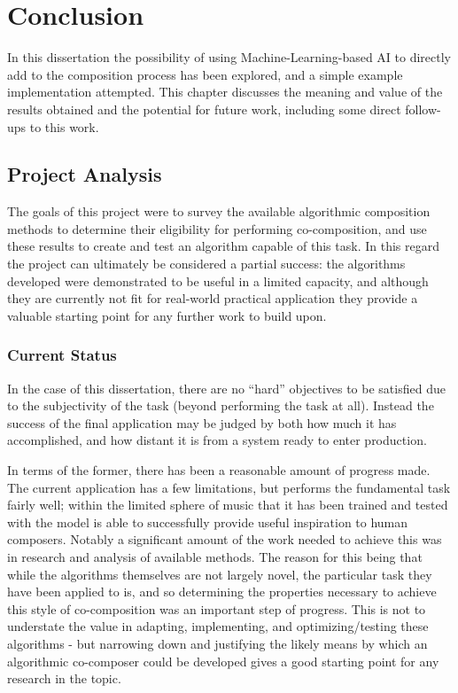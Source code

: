 \documentclass[ author={Stephen Livermore-Tozer},
				supervisor={Dr. Peter Flach},
				degree={MEng},
				title={Algorithmic Co-composition Using Machine Learning},
				subtitle={},
				type={research},
				year={2016} ]{dissertation}
\begin{document}
	
	\chapter{Conclusion}
	\label{chap:conclusion}
	
	In this dissertation the possibility of using Machine-Learning-based AI to directly add to the composition process has been explored, and a simple example implementation attempted. This chapter discusses the meaning and value of the results obtained and the potential for future work, including some direct follow-ups to this work.
	
	\section{Project Analysis}
	\label{sec:project-analysis}
	
	The goals of this project were to survey the available algorithmic composition methods to determine their eligibility for performing co-composition, and use these results to create and test an algorithm capable of this task. In this regard the project can ultimately be considered a partial success: the algorithms developed were demonstrated to be useful in a limited capacity, and although they are currently not fit for real-world practical application they provide a valuable starting point for any further work to build upon.
	
	\subsection{Current Status}
	\label{sec:project-status}
	
	In the case of this dissertation, there are no ``hard'' objectives to be satisfied due to the subjectivity of the task (beyond performing the task at all). Instead the success of the final application may be judged by both how much it has accomplished, and how distant it is from a system ready to enter production.
	
	In terms of the former, there has been a reasonable amount of progress made. The current application has a few limitations, but performs the fundamental task fairly well; within the limited sphere of music that it has been trained and tested with the model is able to successfully provide useful inspiration to human composers. Notably a significant amount of the work needed to achieve this was in research and analysis of available methods. The reason for this being that while the algorithms themselves are not largely novel, the particular task they have been applied to is, and so determining the properties necessary to achieve this style of co-composition was an important step of progress. This is not to understate the value in adapting, implementing, and optimizing/testing these algorithms - but narrowing down and justifying the likely means by which an algorithmic co-composer could be developed gives a good starting point for any research in the topic.
	
\end{document}

